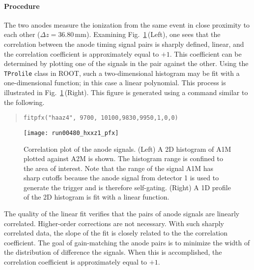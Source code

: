 \paragraph{Procedure}
\begin{sloppypar}
The two anodes measure the ionization from the same event in close proximity to each other ($\Delta z=36.80$\,mm).  Examining Fig.~\ref{lin_fit}\,(Left), one sees that the correlation between the anode timing signal pairs is sharply defined, linear, and the correlation coefficient is approximately equal to $+1$.  %
This coefficient can be determined by plotting one of the signals in the pair against the other.  Using the \texttt{TProlile} class in ROOT, such a two-dimensional histogram may be fit with a one-dimensional function; in this case a linear polynomial.  This process is illustrated in Fig.~\ref{lin_fit}\,(Right). %
This figure is generated using a command similar to the following.
\vsetroot
\begin{quote}
\begin{Verbatim}[firstnumber=0]
fitpfx("haaz4", 9700, 10100,9830,9950,1,0,0)
\end{Verbatim}
\end{quote}

\end{sloppypar}

\begin{figure}
\centering
\texttt{[image: run00480\_hxxz1\_pfx]}
\caption{Correlation plot of the anode signals.  (Left) A 2D histogram of A1M plotted against A2M is shown.  The histogram range is confined to the area of interest.  Note that the range of the signal A1M has sharp cutoffs because the anode signal from detector 1 is used to generate the trigger and is therefore self-gating. (Right) A 1D profile of the 2D histogram is fit with a linear function.}
\label{lin_fit}
\end{figure}

The quality of the linear fit verifies that the pairs of anode signals are linearly correlated.  Higher-order corrections are not necessary.  With such sharply correlated data, the slope of the fit %
is closely related to the the correlation coefficient.  The goal of gain-matching the anode pairs is to minimize the width of the distribution of difference the signals.  When this is accomplished, the correlation coefficient is approximately equal to $+1$. %

